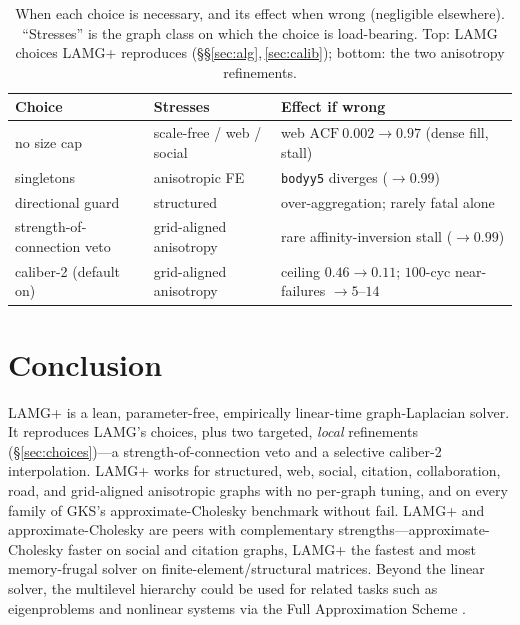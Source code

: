 \documentclass{siamart220329}
\newcommand{\acf}{\mathrm{ACF}}
\begin{document}
\begin{table}[t]\centering\footnotesize\setlength{\tabcolsep}{4pt}
\caption{When each choice is necessary, and its effect when wrong (negligible elsewhere).
``Stresses'' is the graph class on which the choice is load-bearing. Top: LAMG choices LAMG+
reproduces (\S\S\ref{sec:alg},\,\ref{sec:calib}); bottom: the two anisotropy refinements.}\label{tab:ablate}
\begin{tabular}{>{\raggedright\arraybackslash}p{2.9cm}
               >{\raggedright\arraybackslash}p{2.9cm}
               >{\raggedright\arraybackslash}p{5.0cm}}
\toprule
Choice & Stresses & Effect if wrong\\
\midrule
no size cap & scale-free / web / social & web $\acf\ 0.002\!\to\!0.97$ (dense fill, stall)\\
singletons & anisotropic FE & \texttt{bodyy5} diverges ($\to0.99$)\\
directional guard & structured & over-aggregation; rarely fatal alone\\
\midrule
strength-of-connection veto & grid-aligned anisotropy & rare affinity-inversion stall ($\to0.99$)\\
caliber-2 (default on) & grid-aligned anisotropy & ceiling $0.46\!\to\!0.11$; $100$-cyc near-failures $\to5$--$14$\\
\bottomrule
\end{tabular}
\end{table}

\section{Conclusion}\label{sec:conclusion}
LAMG+ is a lean, parameter-free, empirically linear-time graph-Laplacian solver. It reproduces LAMG's choices, plus two targeted, \emph{local} refinements (\S\ref{sec:choices})---a
strength-of-connection veto and a selective caliber-2 interpolation. LAMG+ works for structured, web, social, citation, collaboration, road, and
grid-aligned anisotropic graphs with no per-graph tuning, and on every family of GKS's
approximate-Cholesky benchmark \cite{gks2023} without fail. LAMG+ and approximate-Cholesky are peers with complementary strengths---approximate-Cholesky faster on
social and citation graphs, LAMG+ the fastest and most memory-frugal solver on
finite-element/structural matrices. Beyond the linear solver, the multilevel hierarchy could be used
for related tasks such as eigenproblems \cite[\S6.4]{lamg} and nonlinear systems via the Full
Approximation Scheme \cite[\S8.1]{guide}.
\end{document}
